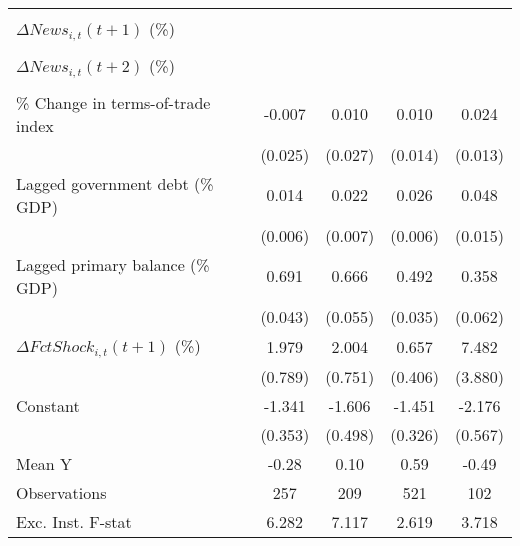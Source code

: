 {\begin{tabular}{l*{4}{c}}
                    &                     &                     &                     &                     \\
\addlinespace
$ \Delta News_{i,t}(t+1)$ (\%)&                     &                     &                     &                     \\
                    &                     &                     &                     &                     \\
\addlinespace
$ \Delta News_{i,t}(t+2)$ (\%)&                     &                     &                     &                     \\
                    &                     &                     &                     &                     \\
\addlinespace
\% Change in terms-of-trade index&      -0.007         &       0.010         &       0.010         &       0.024         \\
                    &     (0.025)         &     (0.027)         &     (0.014)         &     (0.013)         \\
\addlinespace
Lagged government debt (\% GDP)&       0.014\sym{**} &       0.022\sym{**} &       0.026\sym{***}&       0.048\sym{***}\\
                    &     (0.006)         &     (0.007)         &     (0.006)         &     (0.015)         \\
\addlinespace
Lagged primary balance (\% GDP)&       0.691\sym{***}&       0.666\sym{***}&       0.492\sym{***}&       0.358\sym{***}\\
                    &     (0.043)         &     (0.055)         &     (0.035)         &     (0.062)         \\
\addlinespace
$ \Delta FctShock_{i,t}(t+1)$ (\%)&       1.979\sym{**} &       2.004\sym{**} &       0.657         &       7.482\sym{*}  \\
                    &     (0.789)         &     (0.751)         &     (0.406)         &     (3.880)         \\
\addlinespace
Constant            &      -1.341\sym{***}&      -1.606\sym{***}&      -1.451\sym{***}&      -2.176\sym{***}\\
                    &     (0.353)         &     (0.498)         &     (0.326)         &     (0.567)         \\
\midrule
Mean Y              &       -0.28         &        0.10         &        0.59         &       -0.49         \\
Observations        &         257         &         209         &         521         &         102         \\
Exc. Inst. F-stat   &       6.282         &       7.117         &       2.619         &       3.718         \\
\bottomrule
\end{tabular}
}
